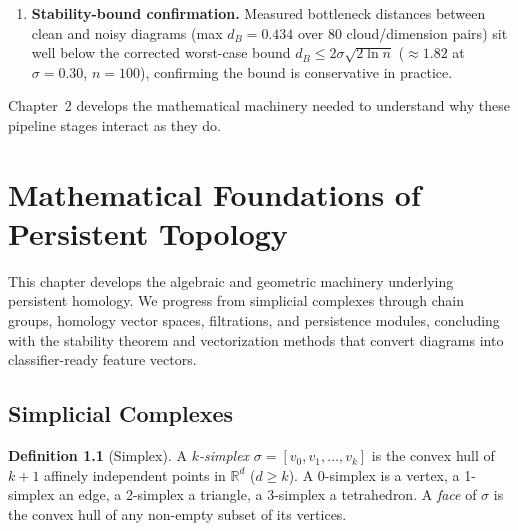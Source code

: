 \documentclass[12pt, a4paper]{report}
\newcommand{\R}{\mathbb{R}}
\theoremstyle{definition}
\newtheorem{definition}{Definition}[chapter]
\theoremstyle{plain}
\theoremstyle{remark}
\begin{document}
\begin{enumerate}
    distributions are quantile-matched, norm features classify at
    chance (48--58\%) while the TDA pipeline sustains 95.83\%
    accuracy at $\sigma = 0.30$ noise --- the noise robustness
    survives the norm/scale confound
    between the sphere and torus geometries.
  \item \textbf{Stability-bound confirmation.} Measured bottleneck
    distances between clean and noisy diagrams (max $d_B = 0.434$
    over 80 cloud/dimension pairs) sit well below the corrected
    worst-case bound $d_B \le 2\sigma\sqrt{2\ln n}$ ($\approx 1.82$
    at $\sigma = 0.30$, $n = 100$), confirming the bound is
    conservative in practice.
\end{enumerate}

\noindent Chapter~2 develops the mathematical machinery needed to
understand why these pipeline stages interact as they do.

\newpage

\chapter{Mathematical Foundations of Persistent Topology}
\label{chap:foundations}

This chapter develops the algebraic and geometric machinery
underlying persistent homology. We progress from simplicial complexes
through chain groups, homology vector spaces, filtrations, and
persistence modules, concluding with the stability theorem and
vectorization methods that convert diagrams into classifier-ready
feature vectors.

\section{Simplicial Complexes}
\label{sec:simplicial}

\begin{definition}[Simplex]
  A \emph{$k$-simplex} $\sigma = [v_0, v_1, \dots, v_k]$ is the
  convex hull of $k+1$ affinely independent points in $\R^d$
  ($d \ge k$). A 0-simplex is a vertex, a 1-simplex an edge, a
  2-simplex a triangle, a 3-simplex a tetrahedron. A \emph{face}
  of $\sigma$ is the convex hull of any non-empty subset of its
  vertices.
\end{definition}
\end{document}

